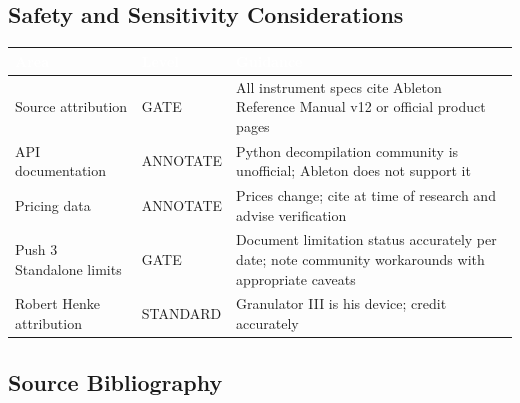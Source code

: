 \documentclass[11pt,letterpaper]{article}
\newcommand{\tableheader}[1]{\textbf{\sffamily\textcolor{white}{#1}}}
\begin{document}
\subsection{Safety and Sensitivity Considerations}

\begin{center}
\begin{tabularx}{\textwidth}{L{3cm}L{2cm}X}
\toprule
{}
\tableheader{Area} & \tableheader{Level} & \tableheader{Guidance} \\
\midrule
Source attribution & GATE & All instrument specs cite Ableton Reference Manual v12 or official product pages \\
API documentation & ANNOTATE & Python decompilation community is unofficial; Ableton does not support it \\
Pricing data & ANNOTATE & Prices change; cite at time of research and advise verification \\
Push 3 Standalone limits & GATE & Document limitation status accurately per date; note community workarounds with appropriate caveats \\
Robert Henke attribution & STANDARD & Granulator III is his device; credit accurately \\
\bottomrule
\end{tabularx}
\end{center}

\subsection{Source Bibliography}
\end{document}
